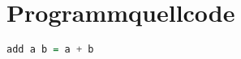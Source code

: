 \chapter{Programmquellcode}

\begin{tiny}

% 

\begin{lstlisting}[language=Haskell]
  add a b = a + b
\end{lstlisting}

\end{tiny}